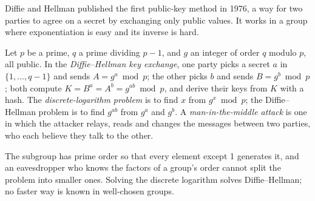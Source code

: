 Diffie and Hellman published the first public-key method in 1976, a way for two parties to agree on a secret by exchanging only public values. %
It works in a group where exponentiation is easy and its inverse is hard.

\begin{definition}\label{def:b3:public-key-cryptography:dh}
Let $p$ be a prime, $q$ a prime dividing $p - 1$, and $g$ an integer of order $q$ modulo $p$, all public. In the \emph{Diffie--Hellman key exchange}, one party picks a secret $a$ in $\{1, \ldots, q - 1\}$ and sends $A = g^a \bmod p$; the other picks $b$ and sends $B = g^b \bmod p$; both compute $K = B^a = A^b = g^{ab} \bmod p$, and derive their keys from $K$ with a hash. The \emph{discrete-logarithm problem} is to find $x$ from $g^x \bmod p$; the Diffie--Hellman problem is to find $g^{ab}$ from $g^a$ and $g^b$. A \emph{man-in-the-middle attack} is one in which the attacker relays, reads and changes the messages between two parties, who each believe they talk to the other.
\end{definition}

The subgroup has prime order so that every element except 1 generates it, and an eavesdropper who knows the factors of a group's order cannot split the problem into smaller ones. Solving the discrete logarithm solves Diffie--Hellman; no faster way is known in well-chosen groups.

\label{lst:b3:public-key-cryptography:dh}

\label{out:b3:public-key-cryptography:dh}

